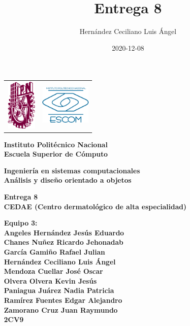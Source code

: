\documentclass[12pt,letterpaper]{article}
\author{Hern\'andez Ceciliano Luis \'Angel}
\title{Entrega 8}
\date {2020-12-08}
\begin{document}
	\pagestyle{plain}
	{

		{
			\begin{tabular}
				{
					p{} 
					p{} 
				}
				\includegraphics[width=1.5cm, height=2.5cm]{ipn.png} &  
				\includegraphics[width=2.5cm, height=2cm]{escom.png}
			\end{tabular}
		}

		\begin{center}

			\par\vspace{1cm} %
			{
				\Huge\textbf
				{
					Instituto Polit\'ecnico Nacional 
					\\[.2cm]Escuela Superior de C\'omputo
				}
			}

			\par\vspace{0.5cm}
			{
				\large\textbf
				{
					Ingenier\'ia en sistemas computacionales 
					\\[.5cm]An\'alisis y diseño orientado a objetos
				}
			}

			\vfill

			\par\vspace{0.7cm}
			{
				\textbf
				{
					Entrega 8 \\
                    CEDAE (Centro dermatológico de alta especialidad)
				}
			}

			\vfill

			\par\vspace{0.7cm}
			{
				\textbf
				{
                    Equipo 3:
                    \\Angeles Hernández Jesús Eduardo
                    \\Chanes Nuñez Ricardo Jehonadab
                    \\García Gamiño Rafael Julian
                    \\Hernández Ceciliano Luis Ángel
                    \\Mendoza Cuellar José Oscar
                    \\Olvera Olvera Kevin Jesús
                    \\Paniagua Juárez Nadia Patricia
                    \\Ramírez Fuentes Edgar Alejandro
                    \\Zamorano Cruz Juan Raymundo
					\\2CV9
				} 
			}


\end{center}}
\end{document}
